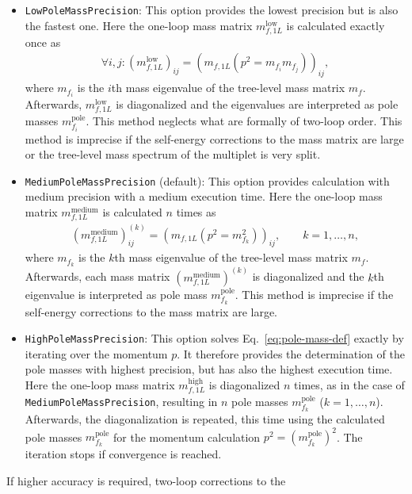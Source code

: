 \documentclass[final,3p,11pt,pdflatex]{elsarticle}
\newcommand{\code}[1]{\lstinline|#1|}  %
\newcommand{\pole}{\text{pole}}
\begin{document}
\begin{itemize}
\item \code{LowPoleMassPrecision}: This option provides the
  lowest precision but is also the fastest one.  Here the one-loop
  mass matrix $m_{f,1L}^\text{low}$ is calculated exactly once as
%
  \begin{align}
    \forall i,j: (m_{f,1L}^\text{low})_{ij} = (m_{f,1L}(p^2 = m_{f_i}
    m_{f_j}))_{ij} ,
  \end{align}
%
  where $m_{f_i}$ is the $i$th mass eigenvalue of the tree-level mass
  matrix $m_f$.  Afterwards, $m_{f,1L}^\text{low}$ is diagonalized and
  the eigenvalues are interpreted as pole masses $m_{f_i}^\pole$.
  This method neglects what are formally of two-loop order.  This
  method is imprecise if the self-energy corrections to the mass
  matrix are large or the tree-level mass spectrum of the multiplet is
  very split.

\item \code{MediumPoleMassPrecision} (default): This option
  provides calculation with medium precision with a medium execution
  time.  Here the one-loop mass matrix $m_{f,1L}^\text{medium}$ is
  calculated $n$ times as
%
  \begin{align}
    (m_{f,1L}^\text{medium})_{ij}^{(k)} = (m_{f,1L}(p^2 =
    m_{f_k}^2))_{ij} , \qquad k = 1,\ldots,n ,
  \end{align}
%
  where $m_{f_k}$ is the $k$th mass eigenvalue of the tree-level mass
  matrix $m_f$.  Afterwards, each mass matrix
  $(m_{f,1L}^\text{medium})^{(k)}$ is diagonalized and the $k$th
  eigenvalue is interpreted as pole mass $m_{f_k}^\pole$.  This method
  is imprecise if the self-energy corrections to the mass matrix are
  large.

\item \code{HighPoleMassPrecision}: This option solves
  Eq.~\eqref{eq:pole-mass-def} exactly by iterating over the momentum
  $p$.  It therefore provides the determination of the pole masses
  with highest precision, but has also the highest execution time.
  Here the one-loop mass matrix $m_{f,1L}^\text{high}$ is diagonalized
  $n$ times, as in the case of \code{MediumPoleMassPrecision},
  resulting in $n$ pole masses $m_{f_k}^\pole$ ($k = 1,\ldots,n$).
  Afterwards, the diagonalization is repeated, this time using the
  calculated pole masses $m_{f_k}^\pole$ for the momentum calculation
  $p^2 = (m_{f_k}^\pole)^2$.  The iteration stops if convergence is
  reached.
\end{itemize}
%
If higher accuracy is required, two-loop corrections to the
\end{document}
